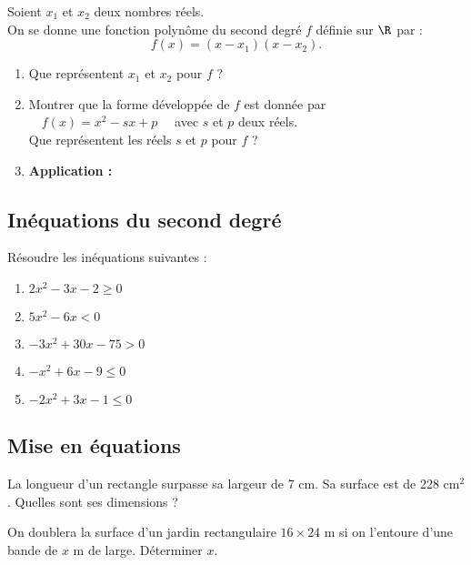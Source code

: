 \documentclass[a4paper,11pt,exos]{nsi} %
\begin{document}
Soient $x_1$ et $x_2$ deux nombres réels.\\
On se donne une fonction polynôme du second degré $f$ définie sur $\R$ par : $$ f(x)=(x-x_1)(x-x_2).$$
\begin{enumerate}
	\item 	Que représentent $x_1$ et $x_2$ pour $f$ ?
	\item 	Montrer que la forme développée de $f$ est donnée par $\quad f(x)=x^2-sx+p\quad$ avec $s$ et $p$ deux réels.\\
	Que représentent les réels $s$ et $p$ pour $f$ ?
	\item	\textbf{Application :}
\end{enumerate}

\subsection*{Inéquations du second degré}

\exo{}
Résoudre les inéquations suivantes :
\begin{multicols}{3}
    	\begin{enumerate}
		\item 	$2x^2-3x-2\geqslant 0$
		\item	$5x^2-6x<0$
		\item 	$-3x^2+30x-75>0$
		\item 	$-x^2+6x-9\leqslant 0$	
		\item 	$-2x^2+3x-1\leqslant 0$
	\end{enumerate}
\end{multicols}

\subsection*{Mise en équations}

\exo{}
	La longueur d'un rectangle surpasse sa largeur de 7 cm. Sa surface est de 228 cm$^2$. Quelles sont ses dimensions ?
	
	\exo{}
	On doublera la surface d'un jardin rectangulaire $16\times 24$ m si on l'entoure d'une bande de $x$ m de large. Déterminer $x$.\\
	
\end{document}
